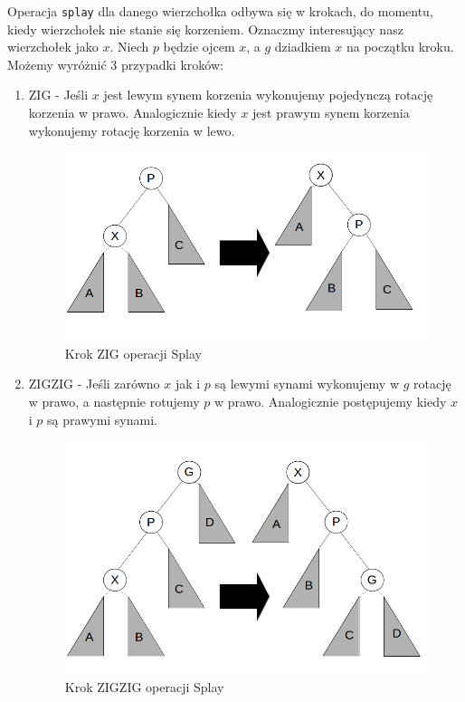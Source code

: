 \documentclass[declaration,shortabstract]{iithesis}
\theoremstyle{thm}
\theoremstyle{remark}
\theoremstyle{plain}
\theoremstyle{plain}
\theoremstyle{plain}
\begin{document}
Operacja \texttt{splay} dla danego wierzchołka odbywa się w krokach, do momentu, kiedy wierzchołek nie stanie się korzeniem. Oznaczmy interesujący nasz wierzchołek jako $x$. Niech $p$ będzie ojcem $x$, a $g$ dziadkiem $x$ na początku kroku. Możemy wyróżnić 3 przypadki kroków: 
\begin{enumerate}  

\item{ZIG - Jeśli $x$ jest lewym synem korzenia wykonujemy pojedynczą rotację korzenia w prawo. Analogicznie kiedy $x$ jest prawym synem korzenia wykonujemy rotację korzenia w lewo.\\  
\begin{figure}[H]
\centering
\includegraphics[scale = 0.3]{zig.png}  
\caption{Krok ZIG operacji Splay}  
\label{fig:zig} 
\end{figure}}   

\item{ZIGZIG - Jeśli zarówno $x$ jak i $p$ są lewymi synami wykonujemy w $g$ rotację w prawo, a następnie rotujemy $p$ w prawo. Analogicznie postępujemy kiedy $x$ i $p$ są prawymi synami.\\  

\begin{figure}[H]  
\centering
    \includegraphics[scale = 0.3]{zigzig.png}
      \caption{Krok ZIGZIG operacji Splay}  
      \label{fig:zigzig} 
      \end{figure}}  


\end{enumerate}
\end{document}
